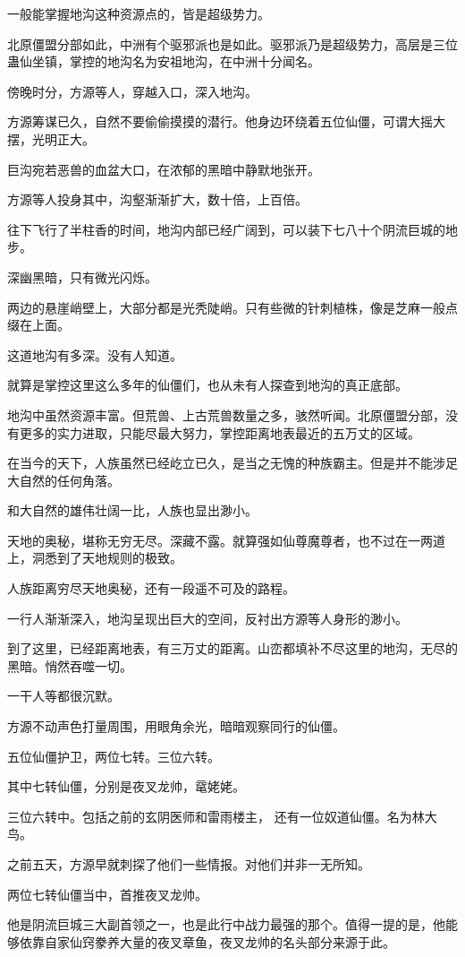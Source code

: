 \begin{this_body}
一般能掌握地沟这种资源点的，皆是超级势力。

北原僵盟分部如此，中洲有个驱邪派也是如此。驱邪派乃是超级势力，高层是三位蛊仙坐镇，掌控的地沟名为安祖地沟，在中洲十分闻名。

傍晚时分，方源等人，穿越入口，深入地沟。

方源筹谋已久，自然不要偷偷摸摸的潜行。他身边环绕着五位仙僵，可谓大摇大摆，光明正大。

巨沟宛若恶兽的血盆大口，在浓郁的黑暗中静默地张开。

方源等人投身其中，沟壑渐渐扩大，数十倍，上百倍。

往下飞行了半柱香的时间，地沟内部已经广阔到，可以装下七八十个阴流巨城的地步。

深幽黑暗，只有微光闪烁。

两边的悬崖峭壁上，大部分都是光秃陡峭。只有些微的针刺植株，像是芝麻一般点缀在上面。

这道地沟有多深。没有人知道。

就算是掌控这里这么多年的仙僵们，也从未有人探查到地沟的真正底部。

地沟中虽然资源丰富。但荒兽、上古荒兽数量之多，骇然听闻。北原僵盟分部，没有更多的实力进取，只能尽最大努力，掌控距离地表最近的五万丈的区域。

在当今的天下，人族虽然已经屹立已久，是当之无愧的种族霸主。但是并不能涉足大自然的任何角落。

和大自然的雄伟壮阔一比，人族也显出渺小。

天地的奥秘，堪称无穷无尽。深藏不露。就算强如仙尊魔尊者，也不过在一两道上，洞悉到了天地规则的极致。

人族距离穷尽天地奥秘，还有一段遥不可及的路程。

一行人渐渐深入，地沟呈现出巨大的空间，反衬出方源等人身形的渺小。

到了这里，已经距离地表，有三万丈的距离。山峦都填补不尽这里的地沟，无尽的黑暗。悄然吞噬一切。

一干人等都很沉默。

方源不动声色打量周围，用眼角余光，暗暗观察同行的仙僵。

五位仙僵护卫，两位七转。三位六转。

其中七转仙僵，分别是夜叉龙帅，鼋姥姥。

三位六转中。包括之前的玄阴医师和雷雨楼主， 还有一位奴道仙僵。名为林大鸟。

之前五天，方源早就刺探了他们一些情报。对他们并非一无所知。

两位七转仙僵当中，首推夜叉龙帅。

他是阴流巨城三大副首领之一，也是此行中战力最强的那个。值得一提的是，他能够依靠自家仙窍豢养大量的夜叉章鱼，夜叉龙帅的名头部分来源于此。


\end{this_body}

